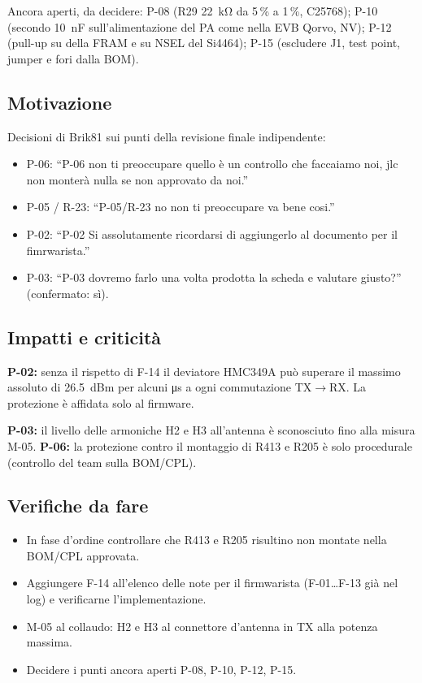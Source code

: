 Ancora aperti, da decidere: P-08 (R29 \SI{22}{\kilo\ohm} da 5\,\% a 1\,\%, C25768); P-10 (secondo \SI{10}{\nano\farad} sull'alimentazione del PA come nella EVB Qorvo, NV); P-12 (pull-up su  della FRAM e su NSEL del Si4464); P-15 (escludere J1, test point, jumper e fori dalla BOM).

\subsection{Motivazione}
Decisioni di Brik81 sui punti della revisione finale indipendente:
\begin{itemize}
\item P-06: ``P-06 non ti preoccupare quello è un controllo che faccaiamo noi, jlc non monterà nulla se non approvato da noi.''
\item P-05 / R-23: ``P-05/R-23 no non ti preoccupare va bene cosi.''
\item P-02: ``P-02 Si assolutamente ricordarsi di aggiungerlo al documento per il fimrwarista.''
\item P-03: ``P-03 dovremo farlo una volta prodotta la scheda e valutare giusto?'' (confermato: sì).
\end{itemize}

\subsection{Impatti e criticità}
\begin{critbox}
\textbf{P-02:} senza il rispetto di F-14 il deviatore HMC349A può superare il massimo assoluto di \SI{26.5}{dBm} per alcuni \si{\micro\second} a ogni commutazione TX$\rightarrow$RX. La protezione è affidata solo al firmware.
\end{critbox}
\begin{notebox}
\textbf{P-03:} il livello delle armoniche H2 e H3 all'antenna è sconosciuto fino alla misura M-05. \textbf{P-06:} la protezione contro il montaggio di R413 e R205 è solo procedurale (controllo del team sulla BOM/CPL).
\end{notebox}

\subsection{Verifiche da fare}
\begin{itemize}
\item In fase d'ordine controllare che R413 e R205 risultino non montate nella BOM/CPL approvata.
\item Aggiungere F-14 all'elenco delle note per il firmwarista (F-01\ldots F-13 già nel log) e verificarne l'implementazione.
\item M-05 al collaudo: H2 e H3 al connettore d'antenna in TX alla potenza massima.
\item Decidere i punti ancora aperti P-08, P-10, P-12, P-15.
\end{itemize}
